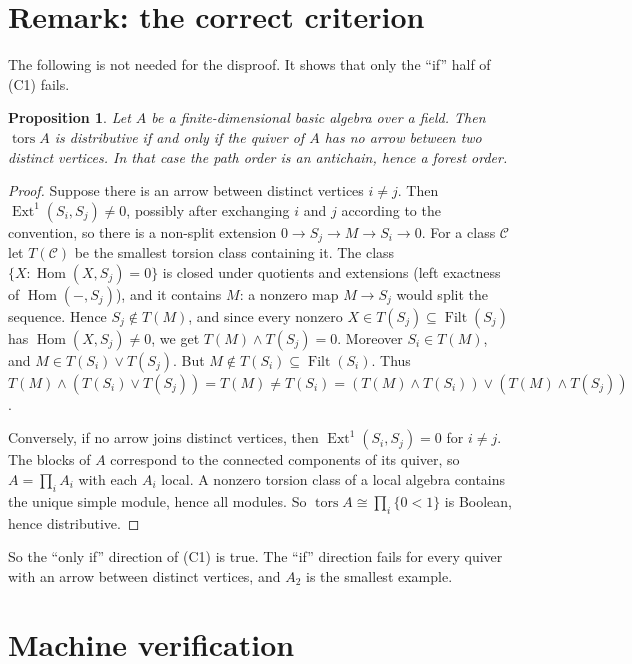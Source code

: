 \documentclass[11pt]{article}
\newtheorem{proposition}[theorem]{Proposition}
\theoremstyle{definition}
\theoremstyle{remark}
\newcommand{\tors}{\operatorname{tors}}
\newcommand{\Filt}{\operatorname{Filt}}
\newcommand{\Hom}{\operatorname{Hom}}
\newcommand{\Ext}{\operatorname{Ext}}
\begin{document}
\section{Remark: the correct criterion}

The following is not needed for the disproof. It shows that only the ``if'' half of (C1) fails.

\begin{proposition}
Let $A$ be a finite-dimensional basic algebra over a field. Then $\tors A$ is distributive if and
only if the quiver of $A$ has no arrow between two distinct vertices. In that case the path order
is an antichain, hence a forest order.
\end{proposition}
\begin{proof}
Suppose there is an arrow between distinct vertices $i\ne j$. Then
$\Ext^1(S_i,S_j)\ne0$, possibly after exchanging $i$ and $j$ according to the convention, so
there is a non-split extension $0\to S_j\to M\to S_i\to0$. For a class $\mathcal C$ let
$T(\mathcal C)$ be the smallest torsion class containing it. The class
$\{X:\Hom(X,S_j)=0\}$ is closed under quotients and extensions (left exactness of
$\Hom(-,S_j)$), and it contains $M$: a nonzero map $M\to S_j$ would split the sequence. Hence
$S_j\notin T(M)$, and since every nonzero $X\in T(S_j)\subseteq\Filt(S_j)$ has
$\Hom(X,S_j)\ne0$, we get $T(M)\wedge T(S_j)=0$. Moreover $S_i\in T(M)$, and $M\in T(S_i)\vee
T(S_j)$. But $M\notin T(S_i)\subseteq\Filt(S_i)$. Thus
$T(M)\wedge(T(S_i)\vee T(S_j))=T(M)\ne T(S_i)=(T(M)\wedge T(S_i))\vee(T(M)\wedge T(S_j))$.

Conversely, if no arrow joins distinct vertices, then $\Ext^1(S_i,S_j)=0$ for $i\ne j$. The
blocks of $A$ correspond to the connected components of its quiver, so $A=\prod_iA_i$ with each
$A_i$ local. A nonzero torsion class of a local algebra contains the unique simple module, hence
all modules. So $\tors A\cong\prod_i\{0<1\}$ is Boolean, hence distributive.
\end{proof}

So the ``only if'' direction of (C1) is true. The ``if'' direction fails for every quiver with an
arrow between distinct vertices, and $A_2$ is the smallest example.

\section{Machine verification}
\end{document}
